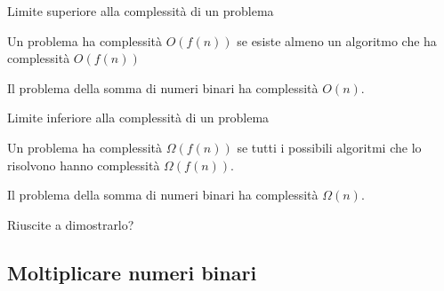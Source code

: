 \begin{frame}{Limite superiore alla complessità di un problema}

\begin{myboxtitle}
Un problema ha complessità $O(f(n))$ se esiste almeno un algoritmo
che ha complessità $O(f(n))$
\end{myboxtitle}

\bigskip
\begin{myboxtitle}
Il problema della somma di numeri binari ha complessità $O(n)$.
\end{myboxtitle}



\end{frame}


\begin{frame}{Limite inferiore alla complessità di un problema}

\begin{myboxtitle}
Un problema ha complessità $\Omega(f(n))$ se tutti i possibili algoritmi che lo risolvono hanno complessità $\Omega(f(n))$.
\end{myboxtitle}

\bigskip
\begin{myboxtitle}
Il problema della somma di numeri binari ha complessità $\Omega(n)$.
\end{myboxtitle}

\begin{myboxtitle}[Domanda]
Riuscite a dimostrarlo?
\end{myboxtitle}

\end{frame}

\subsection{Moltiplicare numeri binari}

